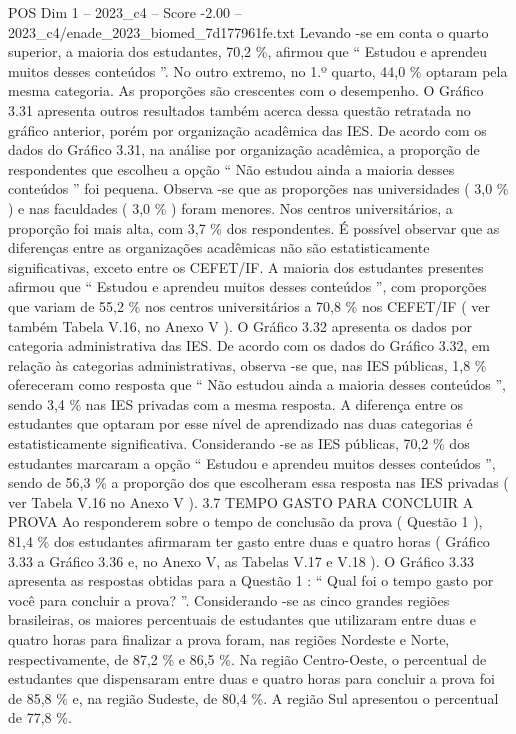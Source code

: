 \begin{textsample}{POS Dim 1 – 2023\_c4 – Score -2.00 – 2023\_c4/enade\_2023\_biomed\_7d177961fe.txt}
Levando -se em conta o quarto superior, a maioria dos estudantes, 70,2 \%, afirmou que “ Estudou e aprendeu muitos desses conteúdos ”.
No outro extremo, no 1.º quarto, 44,0 \% optaram pela mesma categoria.
As proporções são crescentes com o desempenho.
O Gráfico 3.31 apresenta outros resultados também acerca dessa questão retratada no gráfico anterior, porém por organização acadêmica das IES.
De acordo com os dados do Gráfico 3.31, na análise por organização acadêmica, a proporção de respondentes que escolheu a opção “ Não estudou ainda a maioria desses conteúdos ” foi pequena.
Observa -se que as proporções nas universidades ( 3,0 \% ) e nas faculdades ( 3,0 \% ) foram menores.
Nos centros universitários, a proporção foi mais alta, com 3,7 \% dos respondentes.
É possível observar que as diferenças entre as organizações acadêmicas não são estatisticamente significativas, exceto entre os CEFET/IF.
A maioria dos estudantes presentes afirmou que “ Estudou e aprendeu muitos desses conteúdos ”, com proporções que variam de 55,2 \% nos centros universitários a 70,8 \% nos CEFET/IF ( ver também Tabela V.16, no Anexo V ).
O Gráfico 3.32 apresenta os dados por categoria administrativa das IES.
De acordo com os dados do Gráfico 3.32, em relação às categorias administrativas, observa -se que, nas IES públicas, 1,8 \% ofereceram como resposta que “ Não estudou ainda a maioria desses conteúdos ”, sendo 3,4 \% nas IES privadas com a mesma resposta.
A diferença entre os estudantes que optaram por esse nível de aprendizado nas duas categorias é estatisticamente significativa.
Considerando -se as IES públicas, 70,2 \% dos estudantes marcaram a opção “ Estudou e aprendeu muitos desses conteúdos ”, sendo de 56,3 \% a proporção dos que escolheram essa resposta nas IES privadas ( ver Tabela V.16 no Anexo V ). 3.7 TEMPO GASTO PARA CONCLUIR A PROVA Ao responderem sobre o tempo de conclusão da prova ( Questão 1 ), 81,4 \% dos estudantes afirmaram ter gasto entre duas e quatro horas ( Gráfico 3.33 a Gráfico 3.36 e, no Anexo V, as Tabelas V.17 e V.18 ).
O Gráfico 3.33 apresenta as respostas obtidas para a Questão 1 : “ Qual foi o tempo gasto por você para concluir a prova? ”.
Considerando -se as cinco grandes regiões brasileiras, os maiores percentuais de estudantes que utilizaram entre duas e quatro horas para finalizar a prova foram, nas regiões Nordeste e Norte, respectivamente, de 87,2 \% e 86,5 \%.
Na região Centro-Oeste, o percentual de estudantes que dispensaram entre duas e quatro horas para concluir a prova foi de 85,8 \% e, na região Sudeste, de 80,4 \%.
A região Sul apresentou o percentual de 77,8 \%.

\end{textsample}
